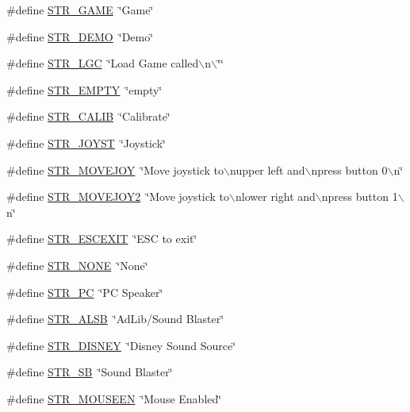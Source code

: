 \begin{DoxyCompactItemize}
\item 
\#define \hyperlink{FOREIGN_8H_a2f4a3d49286aa4868537a71a45ecc850}{STR\_\-GAME}~\char`\"{}Game\char`\"{}
\item 
\#define \hyperlink{FOREIGN_8H_a71a63fd8d73733362c05416410fc5c30}{STR\_\-DEMO}~\char`\"{}Demo\char`\"{}
\item 
\#define \hyperlink{FOREIGN_8H_ab9a5a6011a46a4b2cd1b3065536cbab4}{STR\_\-LGC}~\char`\"{}Load Game called$\backslash$n$\backslash$\char`\"{}\char`\"{}
\item 
\#define \hyperlink{FOREIGN_8H_a68eb6ded92ef28a97b3ef52d92c4a775}{STR\_\-EMPTY}~\char`\"{}empty\char`\"{}
\item 
\#define \hyperlink{FOREIGN_8H_a2266071ac777f6d76dbcde7e4e48c5dd}{STR\_\-CALIB}~\char`\"{}Calibrate\char`\"{}
\item 
\#define \hyperlink{FOREIGN_8H_aac3ed17b937cedec36c2b389b62cfa66}{STR\_\-JOYST}~\char`\"{}Joystick\char`\"{}
\item 
\#define \hyperlink{FOREIGN_8H_a8ee4fd386c1c7bcb7a57c5b46f18b759}{STR\_\-MOVEJOY}~\char`\"{}Move joystick to$\backslash$nupper left and$\backslash$npress button 0$\backslash$n\char`\"{}
\item 
\#define \hyperlink{FOREIGN_8H_a808f57eb43733c506858ea7ea48a0ce6}{STR\_\-MOVEJOY2}~\char`\"{}Move joystick to$\backslash$nlower right and$\backslash$npress button 1$\backslash$n\char`\"{}
\item 
\#define \hyperlink{FOREIGN_8H_a494bddb9606e44a9e85a194ebf80feb8}{STR\_\-ESCEXIT}~\char`\"{}ESC to exit\char`\"{}
\item 
\#define \hyperlink{FOREIGN_8H_afe31e7691d6ff56f21f4762bf899af2d}{STR\_\-NONE}~\char`\"{}None\char`\"{}
\item 
\#define \hyperlink{FOREIGN_8H_a5757f9a98d9b096a82ea673505adec0d}{STR\_\-PC}~\char`\"{}PC Speaker\char`\"{}
\item 
\#define \hyperlink{FOREIGN_8H_afee683abbd8c930908f38e0359ba7ff8}{STR\_\-ALSB}~\char`\"{}AdLib/Sound Blaster\char`\"{}
\item 
\#define \hyperlink{FOREIGN_8H_a60a00828499124d1eedeb7dc43011753}{STR\_\-DISNEY}~\char`\"{}Disney Sound Source\char`\"{}
\item 
\#define \hyperlink{FOREIGN_8H_a1347c73ea1636774fcbfcc2cc8468669}{STR\_\-SB}~\char`\"{}Sound Blaster\char`\"{}
\item 
\#define \hyperlink{FOREIGN_8H_afb23262dc35db01b91088ffe345a878c}{STR\_\-MOUSEEN}~\char`\"{}Mouse Enabled\char`\"{}
\item 

\end{DoxyCompactItemize}
